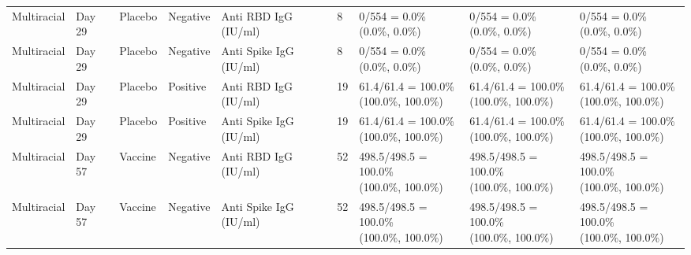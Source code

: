 \documentclass[]{book}
\theoremstyle{definition}
\theoremstyle{definition}
\theoremstyle{definition}
\newcommand{\1}{\mathbbm{1}}
\begin{document}
\begin{landscape}
\begin{ThreePartTable}
\begin{longtable}[t]{>{\raggedright\arraybackslash}p{2.7cm}llllllll}
\hspace{1em}Multiracial & Day 29 & Placebo & Negative & Anti RBD IgG (IU/ml) & 8 & \makecell[l]{0/554 = 0.0\%\\(0.0\%, 0.0\%)} & \makecell[l]{0/554 = 0.0\%\\(0.0\%, 0.0\%)} & \makecell[l]{0/554 = 0.0\%\\(0.0\%, 0.0\%)}\\
\hspace{1em}Multiracial & Day 29 & Placebo & Negative & Anti Spike IgG (IU/ml) & 8 & \makecell[l]{0/554 = 0.0\%\\(0.0\%, 0.0\%)} & \makecell[l]{0/554 = 0.0\%\\(0.0\%, 0.0\%)} & \makecell[l]{0/554 = 0.0\%\\(0.0\%, 0.0\%)}\\
\hspace{1em}Multiracial & Day 29 & Placebo & Positive & Anti RBD IgG (IU/ml) & 19 & \makecell[l]{61.4/61.4 = 100.0\%\\(100.0\%, 100.0\%)} & \makecell[l]{61.4/61.4 = 100.0\%\\(100.0\%, 100.0\%)} & \makecell[l]{61.4/61.4 = 100.0\%\\(100.0\%, 100.0\%)}\\
\hspace{1em}Multiracial & Day 29 & Placebo & Positive & Anti Spike IgG (IU/ml) & 19 & \makecell[l]{61.4/61.4 = 100.0\%\\(100.0\%, 100.0\%)} & \makecell[l]{61.4/61.4 = 100.0\%\\(100.0\%, 100.0\%)} & \makecell[l]{61.4/61.4 = 100.0\%\\(100.0\%, 100.0\%)}\\
\hspace{1em}Multiracial & Day 57 & Vaccine & Negative & Anti RBD IgG (IU/ml) & 52 & \makecell[l]{498.5/498.5 = 100.0\%\\(100.0\%, 100.0\%)} & \makecell[l]{498.5/498.5 = 100.0\%\\(100.0\%, 100.0\%)} & \makecell[l]{498.5/498.5 = 100.0\%\\(100.0\%, 100.0\%)}\\
\hspace{1em}Multiracial & Day 57 & Vaccine & Negative & Anti Spike IgG (IU/ml) & 52 & \makecell[l]{498.5/498.5 = 100.0\%\\(100.0\%, 100.0\%)} & \makecell[l]{498.5/498.5 = 100.0\%\\(100.0\%, 100.0\%)} & \makecell[l]{498.5/498.5 = 100.0\%\\(100.0\%, 100.0\%)}\\

\end{longtable}
\end{ThreePartTable}
\end{landscape}
\end{document}
